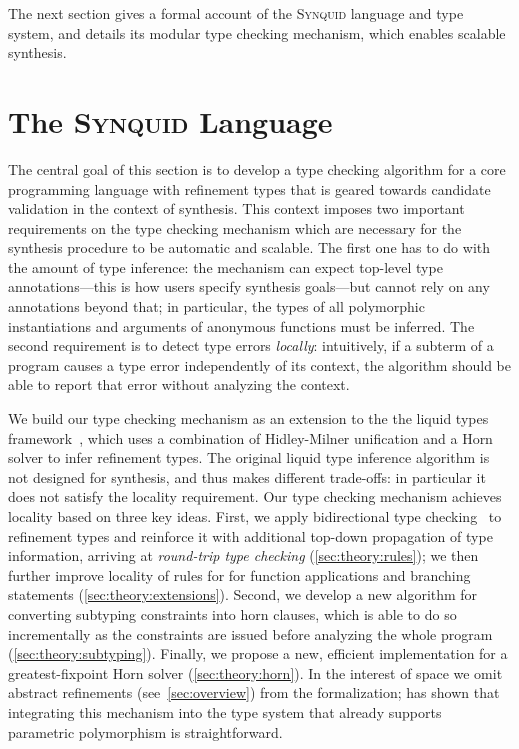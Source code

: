 \documentclass[10pt,preprint]{sigplanconf-pldi16}
\theoremstyle{definition}
\newcommand{\lang}{\textsc{Synquid}\xspace}
\begin{document}
The next section gives a formal account of the \lang language and type system,
and details its modular type checking mechanism, which enables scalable synthesis.





\section{The \lang Language}\label{sec:theory}

The central goal of this section is to develop a type checking algorithm for a core programming language with refinement types
that is geared towards candidate validation in the context of synthesis.
This context imposes two important requirements on the type checking mechanism
which are necessary for the synthesis procedure to be automatic and scalable.
The first one has to do with the amount of type inference:
the mechanism can expect top-level type annotations---this is how users specify synthesis goals---but cannot rely on any annotations beyond that; 
in particular, the types of all polymorphic instantiations and arguments of anonymous functions must be inferred.
The second requirement is to detect type errors \emph{locally}:
intuitively, if a subterm of a program causes a type error independently of its context,
the algorithm should be able to report that error without analyzing the context.

We build our type checking mechanism as an extension to the the liquid types framework~\cite{RondonKaJh08,KawaguchiRoJh09}, 
which uses a combination of Hidley-Milner unification and a Horn solver to infer refinement types.
The original liquid type inference algorithm is not designed for synthesis, 
and thus makes different trade-offs:
in particular it does not satisfy the locality requirement.
Our type checking mechanism achieves locality based on three key ideas.
First, we apply bidirectional type checking~\cite{PierceTu00} to refinement types
and reinforce it with additional top-down propagation of type information,
arriving at \emph{round-trip type checking} (\autoref{sec:theory:rules});
we then further improve locality of rules for for function applications and branching statements (\autoref{sec:theory:extensions}).
Second, we develop a new algorithm for converting subtyping constraints into horn clauses, 
which is able to do so incrementally as the constraints are issued before analyzing the whole program (\autoref{sec:theory:subtyping}).
Finally, we propose a new, efficient implementation for a greatest-fixpoint Horn solver (\autoref{sec:theory:horn}).
In the interest of space we omit abstract refinements (see~\autoref{sec:overview}) from the formalization;
\cite{VazouRoJh13} has shown that integrating this mechanism into the type system that already supports parametric polymorphism is straightforward.
\end{document}
